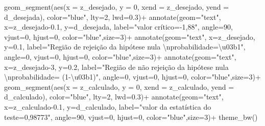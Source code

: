 \documentclass[
]{book}
\newenvironment{Shaded}{\begin{snugshade}}{\end{snugshade}}
\newcommand{\AttributeTok}[1]{\textcolor[rgb]{0.77,0.63,0.00}{#1}}
\newcommand{\DecValTok}[1]{\textcolor[rgb]{0.00,0.00,0.81}{#1}}
\newcommand{\FloatTok}[1]{\textcolor[rgb]{0.00,0.00,0.81}{#1}}
\newcommand{\FunctionTok}[1]{\textcolor[rgb]{0.00,0.00,0.00}{#1}}
\newcommand{\NormalTok}[1]{#1}
\newcommand{\SpecialCharTok}[1]{\textcolor[rgb]{0.00,0.00,0.00}{#1}}
\newcommand{\StringTok}[1]{\textcolor[rgb]{0.31,0.60,0.02}{#1}}
\begin{document}
\begin{Shaded}
\begin{Highlighting}[]
\FunctionTok{geom\_segment}\NormalTok{(}\FunctionTok{aes}\NormalTok{(}\AttributeTok{x =}\NormalTok{ z\_desejado, }\AttributeTok{y =} \DecValTok{0}\NormalTok{, }\AttributeTok{xend =}\NormalTok{ z\_desejado, }\AttributeTok{yend =}\NormalTok{ d\_desejada), }\AttributeTok{color=}\StringTok{"blue"}\NormalTok{, }\AttributeTok{lty=}\DecValTok{2}\NormalTok{, }\AttributeTok{lwd=}\FloatTok{0.3}\NormalTok{)}\SpecialCharTok{+}
\FunctionTok{annotate}\NormalTok{(}\AttributeTok{geom=}\StringTok{"text"}\NormalTok{, }\AttributeTok{x=}\NormalTok{z\_desejado}\FloatTok{{-}0.1}\NormalTok{, }\AttributeTok{y=}\NormalTok{d\_desejada, }\AttributeTok{label=}\StringTok{"valor crítico={-}1,88"}\NormalTok{, }\AttributeTok{angle=}\DecValTok{90}\NormalTok{, }\AttributeTok{vjust=}\DecValTok{0}\NormalTok{, }\AttributeTok{hjust=}\DecValTok{0}\NormalTok{, }\AttributeTok{color=}\StringTok{"blue"}\NormalTok{,}\AttributeTok{size=}\DecValTok{3}\NormalTok{)}\SpecialCharTok{+}
\FunctionTok{annotate}\NormalTok{(}\AttributeTok{geom=}\StringTok{"text"}\NormalTok{, }\AttributeTok{x=}\NormalTok{z\_desejado, }\AttributeTok{y=}\FloatTok{0.1}\NormalTok{, }\AttributeTok{label=}\StringTok{"Região de rejeição da hipótese nula }\SpecialCharTok{\textbackslash{}n}\StringTok{probabilidade=\textbackslash{}u03b1"}\NormalTok{, }\AttributeTok{angle=}\DecValTok{0}\NormalTok{, }\AttributeTok{vjust=}\DecValTok{0}\NormalTok{, }\AttributeTok{hjust=}\DecValTok{0}\NormalTok{, }\AttributeTok{color=}\StringTok{"blue"}\NormalTok{,}\AttributeTok{size=}\DecValTok{3}\NormalTok{)}\SpecialCharTok{+}
\FunctionTok{annotate}\NormalTok{(}\AttributeTok{geom=}\StringTok{"text"}\NormalTok{, }\AttributeTok{x=}\NormalTok{z\_desejado}\DecValTok{{-}3}\NormalTok{, }\AttributeTok{y=}\FloatTok{0.2}\NormalTok{, }\AttributeTok{label=}\StringTok{"Região de não rejeição da hipótese nula  }\SpecialCharTok{\textbackslash{}n}\StringTok{probabilidade= (1{-}\textbackslash{}u03b1)"}\NormalTok{, }\AttributeTok{angle=}\DecValTok{0}\NormalTok{, }\AttributeTok{vjust=}\DecValTok{0}\NormalTok{, }\AttributeTok{hjust=}\DecValTok{0}\NormalTok{, }\AttributeTok{color=}\StringTok{"blue"}\NormalTok{,}\AttributeTok{size=}\DecValTok{3}\NormalTok{)}\SpecialCharTok{+}
  \FunctionTok{geom\_segment}\NormalTok{(}\FunctionTok{aes}\NormalTok{(}\AttributeTok{x =}\NormalTok{ z\_calculado, }\AttributeTok{y =} \DecValTok{0}\NormalTok{, }\AttributeTok{xend =}\NormalTok{ z\_calculado, }\AttributeTok{yend =}\NormalTok{ d\_calculado), }\AttributeTok{color=}\StringTok{"blue"}\NormalTok{, }\AttributeTok{lty=}\DecValTok{2}\NormalTok{, }\AttributeTok{lwd=}\FloatTok{0.3}\NormalTok{)}\SpecialCharTok{+}
  \FunctionTok{annotate}\NormalTok{(}\AttributeTok{geom=}\StringTok{"text"}\NormalTok{, }\AttributeTok{x=}\NormalTok{z\_calculado}\FloatTok{{-}0.1}\NormalTok{, }\AttributeTok{y=}\NormalTok{d\_calculado, }\AttributeTok{label=}\StringTok{"valor da estatística do teste=0,98773"}\NormalTok{, }\AttributeTok{angle=}\DecValTok{90}\NormalTok{, }\AttributeTok{vjust=}\DecValTok{0}\NormalTok{, }\AttributeTok{hjust=}\DecValTok{0}\NormalTok{, }\AttributeTok{color=}\StringTok{"blue"}\NormalTok{,}\AttributeTok{size=}\DecValTok{3}\NormalTok{)}\SpecialCharTok{+}
  \FunctionTok{theme\_bw}\NormalTok{()}
\end{Highlighting}
\end{Shaded}
\end{document}
